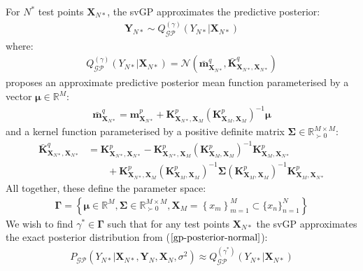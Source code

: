 \documentclass{article}
\newcommand{\GP}{\operatorname{\mathcal{GP}}}
\numberwithin{equation}{section}
\begin{document}
For $N^*$ test points $\mathbf{X}_{N*}$, the svGP approximates the predictive posterior:
\begin{align}
    \mathbf{Y}_{N*} \sim Q_{\GP}^{(\gamma)}\left(Y_{N*} \vert \mathbf{X}_{N*}\right)
\end{align}
where:
\begin{align}
    Q_{\GP}^{(\gamma)}\left(Y_{N*} \vert \mathbf{X}_{N*}\right) = \mathcal{N}\left(\bar{\mathbf{m}}_{\mathbf{X}_{N*}}^{q}, \bar{\mathbf{K}}_{\mathbf{X}_{N*}, \mathbf{X}_{N*}}^{q}\right)
\end{align}
\cite{titsias2009variational} proposes an approximate predictive posterior mean function parameterised by a vector $\boldsymbol{\mu} \in \mathbb{R}^M$:
\begin{align}
    \bar{\mathbf{m}}_{\mathbf{X}_{N*}}^{q} = \mathbf{m}^p_{\mathbf{X}_{N*}} + \mathbf{K}^p_{\mathbf{X}_{N*}, \mathbf{X}_M}\left(\mathbf{K}^p_{\mathbf{X}_M,\mathbf{X}_M}\right)^{-1} \boldsymbol{\mu}
\end{align}
and a kernel function parameterised by a positive definite matrix $\mathbf{\Sigma} \in \mathbb{R}^{M\times M}_{\succ 0}$:
\begin{align}
\bar{\mathbf{K}}_{\mathbf{X}_{N*}, \mathbf{X}_{N*}}^{q} & = \mathbf{K}^p_{\mathbf{X}_{N*}, \mathbf{X}_{N*}} - \mathbf{K}^p_{\mathbf{X}_{N*}, \mathbf{X}_M} \left(\mathbf{K}^p_{\mathbf{X}_M, \mathbf{X}_M}\right)^{-1}\mathbf{K}^p_{\mathbf{X}_M, \mathbf{X}_{N*}} \nonumber \\
&\qquad + \mathbf{K}^p_{\mathbf{X}_{N*}, \mathbf{X}_M}  \left(\mathbf{K}^p_{\mathbf{X}_M, \mathbf{X}_M}\right)  ^{-1} \mathbf{\Sigma} \left(\mathbf{K}^p_{\mathbf{X}_M, \mathbf{X}_M}\right)^{-1}\mathbf{K}^p_{\mathbf{X}_M, \mathbf{X}_{N*}}
\end{align}
All together, these define the parameter space:
\begin{align}
    \mathbf{\Gamma} = \left\{\boldsymbol{\mu} \in \mathbb{R}^{M}, \mathbf{\Sigma} \in \mathbb{R}^{M\times M}_{\succ 0}, \mathbf{X}_M = \left\{x_m\right\}_{m=1}^{M} \subset \{x_n\}_{n=1}^{N}\right\}
\end{align}
We wish to find $\gamma^* \in \mathbf{\Gamma}$ such that for any test points $\mathbf{X}_{N*}$ the svGP approximates the exact posterior distribution from ($\ref{gp-posterior-normal}$):
\begin{align}
    P_{\GP}\left(Y_{N*} \vert \mathbf{X}_{N*}, \mathbf{Y}_N, \mathbf{X}_N, \sigma^2 \right) \approx Q_{\GP}^{(\gamma^*)}\left(Y_{N*} \vert \mathbf{X}_{N*}\right)
\end{align}
\end{document}
